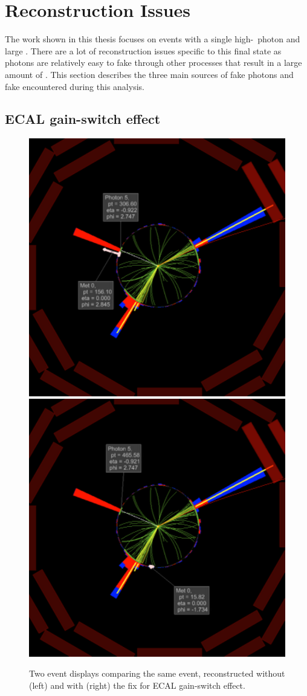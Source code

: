 \section{Reconstruction Issues}
\label{sec:issues}

The work shown in this thesis focuses on events with a single high-\pt\ photon and large \met.
There are a lot of reconstruction issues specific to this final state as photons are relatively easy to fake through other processes that result in a large amount of \met.
This section describes the three main sources of fake photons and fake \met encountered during this analysis.

\subsection{ECAL gain-switch effect}
\label{sec:gainswitch}

\begin{figure}[htbp]
  \centering
  \includegraphics[width=0.48\linewidth]{Reconstruction/Figures/gsfix/evdisp_before.pdf}
  \includegraphics[width=0.48\linewidth]{Reconstruction/Figures/gsfix/evdisp_after.pdf}
  \caption{
    Two event displays comparing the same event, reconstructed without (left) and with (right) the fix for ECAL gain-switch effect.
  }
  \label{fig:eventdisplay_gsfix}
\end{figure}

